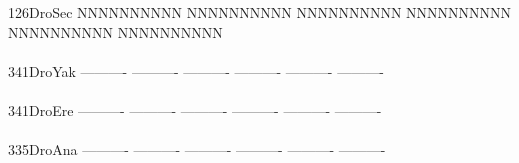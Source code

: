 \documentclass[11pt,twoside,reqno,a4paper]{article}
\begin{document}
{126\hspace*{1\charwidth}DroSec	NNNNNNNNNN	NNNNNNNNNN	NNNNNNNNNN	NNNNNNNNNN	NNNNNNNNNN	NNNNNNNNNN	\\
\hspace*{4\charwidth}\hspace*{7\charwidth}\hspace*{1\charwidth}\hspace*{1\charwidth}\hspace*{1\charwidth}\hspace*{1\charwidth}\hspace*{1\charwidth}\hspace*{1\charwidth}\\
341\hspace*{1\charwidth}DroYak	----------	----------	----------	----------	----------	----------	\\
\hspace*{4\charwidth}\hspace*{7\charwidth}\hspace*{1\charwidth}\hspace*{1\charwidth}\hspace*{1\charwidth}\hspace*{1\charwidth}\hspace*{1\charwidth}\hspace*{1\charwidth}\\
341\hspace*{1\charwidth}DroEre	----------	----------	----------	----------	----------	----------	\\
\hspace*{4\charwidth}\hspace*{7\charwidth}\hspace*{1\charwidth}\hspace*{1\charwidth}\hspace*{1\charwidth}\hspace*{1\charwidth}\hspace*{1\charwidth}\hspace*{1\charwidth}\\
335\hspace*{1\charwidth}DroAna	----------	----------	----------	----------	----------	----------	\\
\hspace*{4\charwidth}\hspace*{7\charwidth}\hspace*{1\charwidth}\hspace*{1\charwidth}\hspace*{1\charwidth}\hspace*{1\charwidth}\hspace*{1\charwidth}\hspace*{1\charwidth}\\
}
\end{document}
